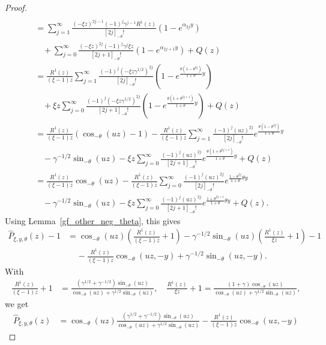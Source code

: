 \documentclass[10pt,a4paper]{amsart}
\newcommand{\1}{\mathds{1}}
\begin{document}
\begin{proof}
\begin{align*}
     \\&=\sum_{j=1}^\infty\frac{(-\xi z)^{2j-1}(-1)^{j}\gamma^{j-1}R^1(z)}{[2j]_{-\theta}!}(1-e^{\alpha_{2j}y})
     \\&~~~~+\sum_{j=0}^\infty\frac{(-\xi z)^{2j}(-1)^{j}\gamma^{j}\xi z}{[2j+1]_{-\theta}!}(1-e^{\alpha_{2j+1}y})+Q(z) 
     \\&=\frac{R^1(z)}{(\xi-1) z}\sum_{j=1}^\infty\frac{(-1)^{j}(-\xi z\gamma^{1/2})^{2j}}{[2j]_{-\theta}!}(1-e^{\frac{\theta(1-\theta^{2j})}{1+\theta}y})
     \\&~~~~+\xi z\sum_{j=0}^\infty\frac{(-1)^{j}(-\xi z\gamma^{1/2})^{2j}}{[2j+1]_{-\theta}!}(1-e^{\frac{\theta(1+\theta^{2j+1})}{1+\theta}y})+Q(z)
     \\&=\frac{R^1(z)}{(\xi-1) z}(\cos_{-\theta}\left(uz\right)-1)-\frac{R^1(z)}{(\xi-1) z}\sum_{j=1}^\infty\frac{(-1)^{j}(uz)^{2j}}{[2j]_{-\theta}!}e^{\frac{\theta(1-\theta^{2j})}{1+\theta}y}
     \\&~~~~-\gamma^{-1/2}\sin_{-\theta}(uz)-\xi z\sum_{j=0}^\infty\frac{(-1)^{j}(uz)^{2j}}{[2j+1]_{-\theta}!}e^{\frac{\theta(1+\theta^{2j+1})}{1+\theta}y}+Q(z)
      \\&=\frac{R^1(z)}{(\xi-1) z}\cos_{-\theta}\left(uz\right)-\frac{R^1(z)}{(\xi-1) z}\sum_{j=0}^\infty\frac{(-1)^{j}(uz)^{2j}}{[2j]_{-\theta}!}e^{\frac{1-\theta^{2j}}{1+\theta}\theta y}
     \\&~~~~-\gamma^{-1/2}\sin_{-\theta}(uz)-\xi z\sum_{j=0}^\infty\frac{(-1)^{j}(uz)^{2j}}{[2j+1]_{-\theta}!}e^{\frac{1+\theta^{2j+1}}{1+\theta}\theta y}+Q(z).
  \end{align*}
Using Lemma~\ref{gf_other_neg_theta}, this gives
 \begin{align*}
     \hat{P}_{\xi,y,\theta}(z)-1
     &=\cos_{-\theta}\left(uz\right)\left(\frac{R^1(z)}{(\xi-1) z}+1\right)
     -\gamma^{-1/2}\sin_{-\theta}\left(uz\right)\left(\frac{R^1(z)}{\xi z}+1\right)-1
     \\&~~~~~-\frac{R^1(z)}{(\xi-1) z}\cos_{-\theta}(uz,-y)
     +\gamma^{-1/2}\sin_{-\theta}(uz,-y).
    \end{align*}
With 
\begin{align*}
    \frac{R^1(z)}{(\xi-1) z}+1
    &=\frac{(\gamma^{1/2}+\gamma^{-1/2})\sin_{-\theta}(uz)}{\cos_{-\theta}(uz)+\gamma^{1/2}\sin_{-\theta}(uz)}, \quad \frac{R^1(z)}{\xi z}+1
    =\frac{(1+\gamma)\cos_{-\theta}(uz)}{\cos_{-\theta}(uz)+\gamma^{1/2}\sin_{-\theta}(uz)},
\end{align*}
we get 
\begin{align*}
    \hat{P}_{\xi,y,\theta}(z)
     &=\cos_{-\theta}\left(uz\right)\frac{(\gamma^{1/2}+\gamma^{-1/2})\sin_{-\theta}(uz)}{\cos_{-\theta}(uz)+\gamma^{1/2}\sin_{-\theta}(uz)}-\frac{R^1(z)}{(\xi-1) z}\cos_{-\theta}(uz,-y)

\end{align*}
\end{proof}
\end{document}
